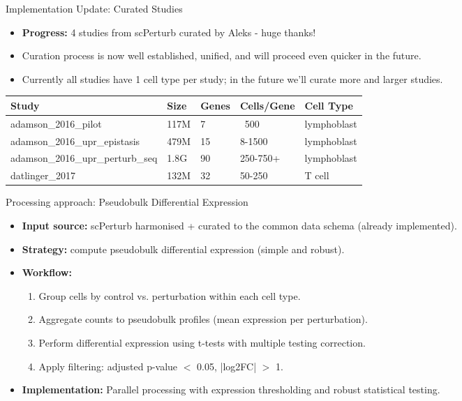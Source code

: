 \documentclass[handout]{beamer}
\begin{document}
\begin{frame}{Implementation Update: Curated Studies}
    \begin{itemize}
        \item \textbf{Progress:} 4 studies from scPerturb curated by Aleks - huge thanks!
        \item Curation process is now well established, unified, and will proceed even quicker in the future.
        \item Currently all studies have 1 cell type per study; in the future we'll curate more and larger studies.
    \end{itemize}
    
    \vspace{1em}
    \footnotesize
    \begin{tabular}{@{}p{2.8cm}p{0.8cm}p{1cm}p{1.2cm}p{1.2cm}@{}}
        \toprule
        \textbf{Study} & \textbf{Size} & \textbf{Genes} & \textbf{Cells/Gene} & \textbf{Cell Type} \\
        \midrule
        adamson\_2016\_pilot & 117M & 7 & ~500 & lymphoblast \\
        adamson\_2016\_upr\_epistasis & 479M & 15 & 8-1500 & lymphoblast \\
        adamson\_2016\_upr\_perturb\_seq & 1.8G & 90 & 250-750+ & lymphoblast \\
        datlinger\_2017 & 132M & 32 & 50-250 & T cell \\
        \bottomrule
    \end{tabular}
\end{frame}

\begin{frame}{Processing approach: Pseudobulk Differential Expression}
    \begin{itemize}
        \item \textbf{Input source:} scPerturb harmonised + curated to the common data schema (already implemented).
        \item \textbf{Strategy:} compute pseudobulk differential expression (simple and robust).
        \item \textbf{Workflow:}
        \begin{enumerate}
            \item Group cells by control vs. perturbation within each cell type.
            \item Aggregate counts to pseudobulk profiles (mean expression per perturbation).
            \item Perform differential expression using t-tests with multiple testing correction.
            \item Apply filtering: adjusted p-value $<$ 0.05, |log2FC| $>$ 1.
        \end{enumerate}
        \item \textbf{Implementation:} Parallel processing with expression thresholding and robust statistical testing.
    \end{itemize}
\end{frame}
\end{document}

